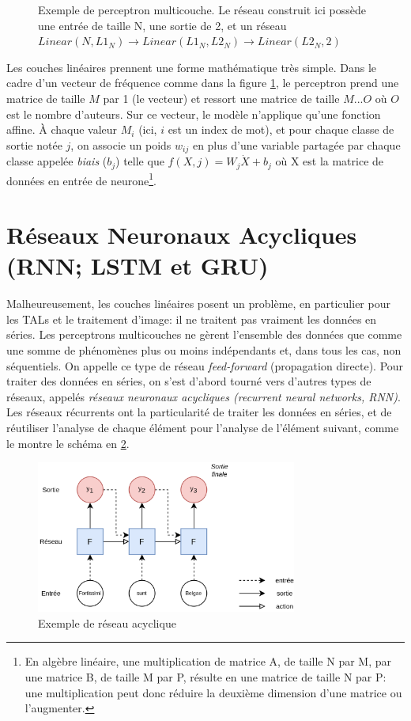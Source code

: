 \begin{figure}[h]
\begin{minipage}{.60\linewidth}
        \caption{Exemple de perceptron multicouche. Le réseau construit ici possède une entrée de taille N, une sortie de 2, et un réseau $Linear(N, L1_N) \rightarrow Linear(L1_N, L2_N) \rightarrow Linear(L2_N, 2)$}
        \label{fig:deep-learning:mlp}
    \end{minipage}%
\end{figure}

Les couches linéaires prennent une forme mathématique très simple. Dans le cadre d'un vecteur de fréquence comme dans la figure \ref{fig:deep-learning:mlp}, le perceptron prend une matrice de taille $M$ par 1 (le vecteur) et ressort une matrice de taille $M...O$ où $O$ est le nombre d'auteurs. Sur ce vecteur, le modèle n'applique qu'une fonction affine. À chaque valeur $M_{i}$ (ici, $i$ est un index de mot), et pour chaque classe de sortie notée $j$, on associe un poids $w_{ij}$ en plus d'une variable partagée par chaque classe appelée \textit{biais} ($b_{j}$) telle que $f(X, j) = W_{j} \dot X + b_{j}$  où X est la matrice de données en entrée de neurone\footnote{En algèbre linéaire, une multiplication de matrice A, de taille N par M, par une matrice B, de taille M par P, résulte en une matrice de taille N par P: une multiplication peut donc réduire la deuxième dimension d'une matrice ou l'augmenter.}.


\section{Réseaux Neuronaux Acycliques (RNN; LSTM et GRU)}

Malheureusement, les couches linéaires posent un problème, en particulier pour les TALs et le traitement d'image: il ne traitent pas vraiment les données en séries. Les perceptrons multicouches ne gèrent l'ensemble des données que comme une somme de phénomènes plus ou moins indépendants et, dans tous les cas, non séquentiels. On appelle ce type de réseau \textit{feed-forward} (propagation directe). Pour traiter des données en séries, on s'est d'abord tourné vers d'autres types de réseaux, appelés \textit{réseaux neuronaux acycliques (recurrent neural networks, RNN)}. Les réseaux récurrents ont la particularité de traiter les données en séries, et de réutiliser l'analyse de chaque élément pour l'analyse de l'élément suivant, comme le montre le schéma en \ref{fig:deep-learning:rnn}.

\begin{figure}[h]
    \centering
    \includegraphics[height=5cm]{figures/chap2/RNN.png}
    \caption{Exemple de réseau acyclique}
    \label{fig:deep-learning:rnn}
\end{figure}

